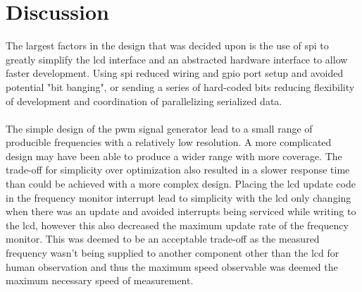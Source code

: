 
\section{Discussion}
The largest factors in the design that was decided upon is the use of
\gls{spi} to greatly simplify the \gls{lcd} interface and an abstracted
hardware interface to allow faster development. Using \gls{spi} reduced
wiring and \gls{gpio} port setup and avoided potential "bit banging", or
sending a series of hard-coded bits reducing flexibility of development
and coordination of parallelizing serialized data. \\

 \\

The simple design of the \gls{pwm} signal generator lead to a small
range of producible frequencies with a relatively low resolution. A more
complicated design may have been able to produce a wider range with more
coverage. The trade-off for simplicity over optimization also resulted
in a slower response time than could be achieved with a more complex
design. Placing the \gls{lcd} update code in the frequency monitor
interrupt lead to simplicity with the \gls{lcd} only changing when there
was an update and avoided interrupts being serviced while writing to the
\gls{lcd}, however this also decreased the maximum update rate of the
frequency monitor. This was deemed to be an acceptable trade-off as the
measured frequency wasn't being supplied to another component other than
the \gls{lcd} for human observation and thus the maximum speed
observable was deemed the maximum necessary speed of measurement.
